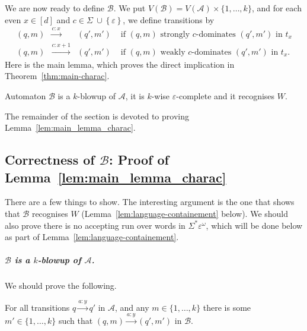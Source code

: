 \documentclass[a4paper,UKenglish,cleveref, thm-restate]{lipics-v2021}
\newcommand{\re}[1]{\xrightarrow{#1}}
\newcommand{\tin}{\text{ in }}
\newcommand{\tif}{\text{ if }}
\newcommand{\eps}{\varepsilon}
\newcommand{\A}{\mathcal{A}}
\newcommand{\Sigmaeps}{\Sigma\ {\cup} \left\{\eps\right\}}
\newcommand{\B}{\mathcal B}
\renewcommand{\d}{[d]}
\begin{document}
We are now ready to define $\B$.
We put $V(\B) = V(\A) \times \{1,\dots,k\}$, and for each even $x \in \d$ and $c \in \Sigmaeps$, we define transitions by
\[
    \begin{array}{lcrl}
    (q,m) &\re{c:x}& (q',m') & \tif (q,m) \text{ strongly $c$-dominates } (q',m') \tin t_x \\
    (q,m) &\re{c:x+1}& (q',m') & \tif (q,m) \text{ weakly $c$-dominates } (q',m')\tin t_x.
    \end{array}
\]
Here is the main lemma, which proves the direct implication in Theorem~\ref{thm:main-charac}.

\begin{lemma}\label{lem:main_lemma_charac}
Automaton $\B$ is a $k$-blowup of $\A$, it is $k$-wise $\eps$-complete and it recognises $W$.
\end{lemma}
The remainder of the section is devoted to proving Lemma~\ref{lem:main_lemma_charac}.

\subsection{Correctness of $\B$: Proof of Lemma~\ref{lem:main_lemma_charac}}

There are a few things to show.
The interesting argument is the one that shows that $\B$ recognises $W$ (Lemma~\ref{lem:language-containement} below).
We should also prove there is no accepting run over words in $\Sigma^*\eps^\omega$, which will be done below as part of Lemma~\ref{lem:language-containement}.

\subparagraph*{$\B$ is a $k$-blowup of $\A$.}

We should prove the following.

\begin{claim}
    For all transitions $q \re{a:y} q'$ in $\A$, and any $m \in \{1,\dots,k\}$ there is some $m' \in\{1,\dots,k\}$ such that $(q,m) \re{a:y} (q',m')$ in $\B$.
\end{claim}
\end{document}
